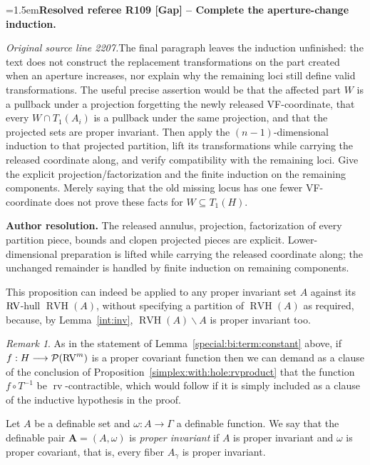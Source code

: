 \documentclass[12pt]{amsart}
\newcommand{\ResolvedRefereeRemark}[5]{%
  \par\medskip\begingroup\normalfont\small\color{gray}%
  \emergencystretch=1.5em\noindent\textbf{Resolved referee R#1 [#2] -- #3.}\par\nobreak\noindent #4\par
  \medskip\color{ResolutionGreen}\noindent\textbf{Author resolution.} #5\par
  \endgroup\medskip
}
\newcommand{\memph}[1]{{\color{magenta}\emph{#1}}}
\theoremstyle{plain}
\theoremstyle{definition}
\theoremstyle{remark}
\newtheorem{rem}[thm]{Remark}
\numberwithin{equation}{section}
\theoremstyle{plain}
\newcommand{\RV}{\textup{RV}}
\newcommand{\0}{\emptyset}
\newcommand{\mdl}[1]{\mathcal{#1}}  %
\newcommand{\fun}{\longrightarrow}
\newcommand{\mi}{\smallsetminus}
\DeclareMathOperator{\rv}{rv}
\DeclareMathOperator{\RVH}{RVH}
\begin{document}
\ResolvedRefereeRemark{109}{Gap}{Complete the aperture-change induction}{%
\textit{Original source line 2207.}\quad The final paragraph leaves the induction unfinished: the text does not construct the replacement transformations on the part created when an aperture increases, nor explain why the remaining loci still define valid transformations. The useful precise assertion would be that the affected part $W$ is a pullback under a projection forgetting the newly released VF-coordinate, that every $W\cap T_1(A_i)$ is a pullback under the same projection, and that the projected sets are proper invariant. Then apply the $(n-1)$-dimensional induction to that projected partition, lift its transformations while carrying the released coordinate along, and verify compatibility with the remaining loci. Give the explicit projection/factorization and the finite induction on the remaining components. Merely saying that the old missing locus has one fewer VF-coordinate does not prove these facts for $W\subseteq T_1(H)$.
}{The released annulus, projection, factorization of every partition piece, bounds and clopen projected pieces are explicit. Lower-dimensional preparation is lifted while carrying the released coordinate along; the unchanged remainder is handled by finite induction on remaining components.}

This proposition can indeed be applied to any proper invariant set $A$ against its $\RV$-hull $\RVH(A)$, without specifying a partition of $\RVH(A)$ as required, because, by  Lemma~\ref{int:inv},   $\RVH(A) \mi A$ is proper invariant too.

\begin{rem}\label{cons:extra}
As in the statement of Lemma~\ref{special:bi:term:constant} above, if $f : H \fun \mdl P(\RV^m)$ is a proper covariant function then we can demand as a clause of the conclusion of Proposition~\ref{simplex:with:hole:rvproduct} that the function $f \circ T^{-1}$ be $\rv$-contractible, which would follow if it is simply included as a clause of the inductive hypothesis in the proof.
\end{rem}

Let $A$ be a definable set and $\omega : A \fun \Gamma$ a definable function. We say that the definable pair $\bm A = (A, \omega)$ is \memph{proper invariant} if $A$ is proper invariant and $\omega$ is proper covariant, that is, every fiber $A_\gamma$ is proper invariant.
\end{document}

